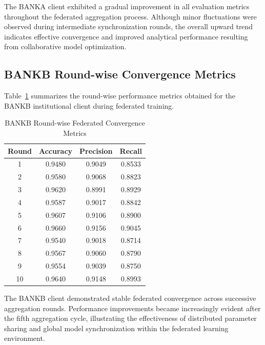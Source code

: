 The BANKA client exhibited a gradual improvement in all evaluation metrics throughout the federated aggregation process. Although minor fluctuations were observed during intermediate synchronization rounds, the overall upward trend indicates effective convergence and improved analytical performance resulting from collaborative model optimization.

\subsection{BANKB Round-wise Convergence Metrics}

Table~\ref{tab:bankb_round_metrics} summarizes the round-wise performance metrics obtained for the BANKB institutional client during federated training.

\begin{table}[H]
\centering
\caption{BANKB Round-wise Federated Convergence Metrics}
\label{tab:bankb_round_metrics}
\renewcommand{\arraystretch}{1.2}
\vspace{0.2cm}
\begin{tabular}{|c|c|c|c|}
\hline
\textbf{Round} & \textbf{Accuracy} & \textbf{Precision} & \textbf{Recall} \\
\hline
1 & 0.9480 & 0.9049 & 0.8533 \\
2 & 0.9580 & 0.9068 & 0.8823 \\
3 & 0.9620 & 0.8991 & 0.8929 \\
4 & 0.9587 & 0.9017 & 0.8842 \\
5 & 0.9607 & 0.9106 & 0.8900 \\
6 & 0.9660 & 0.9156 & 0.9045 \\
7 & 0.9540 & 0.9018 & 0.8714 \\
8 & 0.9567 & 0.9060 & 0.8790 \\
9 & 0.9554 & 0.9039 & 0.8750 \\
10 & 0.9640 & 0.9148 & 0.8993 \\
\hline
\end{tabular}
\end{table}

The BANKB client demonstrated stable federated convergence across successive aggregation rounds. Performance improvements became increasingly evident after the fifth aggregation cycle, illustrating the effectiveness of distributed parameter sharing and global model synchronization within the federated learning environment.


